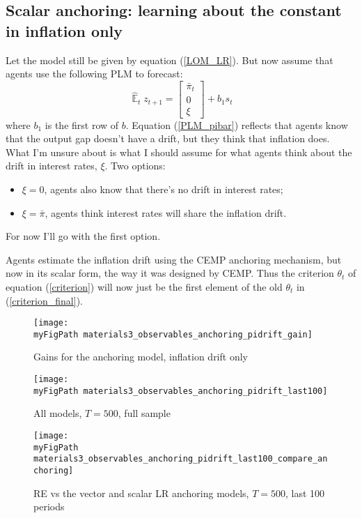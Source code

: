 \documentclass[11pt]{article}
\def \myFigPath {../figures/}
\renewcommand{\[}{\begin{equation}}
\renewcommand{\]}{\end{equation}}
\DeclareMathOperator{\E}{\mathbb{E}}
\def\myBiggerFigScale{0.4}
\def\myFigScale{0.3}
\begin{document}
\newpage
\subsection{Scalar anchoring: learning about the constant in inflation only}
 Let the model still be given by equation (\ref{LOM_LR}). But now assume that agents use the following PLM to forecast:
 \begin{equation}
 \hat{\E}_{t}z_{t+1} =  \begin{bmatrix} \bar{\pi}_{t} \\ 0 \\ \xi \label{PLM_pibar}
 \end{bmatrix} + b_1 s_t 
 \end{equation}
where $b_1$ is the first row of $b$. Equation (\ref{PLM_pibar}) reflects that agents know that the output gap doesn't have a drift, but they think that inflation does. What I'm unsure about is what I should assume for what agents think about the drift in interest rates, $\xi$. Two options:
\begin{itemize}
\item $\xi = 0$, agents also know that there's no drift in interest rates;
\item $\xi = \bar{\pi}$, agents think interest rates will share the inflation drift.  %
\end{itemize}
For now I'll go with the first option. 

Agents estimate the inflation drift using the CEMP anchoring mechanism, but now in its scalar form, the way it was designed by CEMP. Thus the criterion $\theta_t$ of equation (\ref{criterion}) will now just be the first element of the old $\theta_t$ in (\ref{criterion_final}). 

\begin{figure}[h!]
\texttt{[image: \\myFigPath materials3\_observables\_anchoring\_pidrift\_gain]} 
\caption{Gains for the anchoring model, inflation drift only}
\end{figure}
\newpage
\begin{figure}[h!]
\texttt{[image: \\myFigPath materials3\_observables\_anchoring\_pidrift\_last100]} 
\caption{All models, $T = 500$, full sample}
\end{figure}

\begin{figure}[h!]
\texttt{[image: \\myFigPath materials3\_observables\_anchoring\_pidrift\_last100\_compare\_anchoring]} 
\caption{RE vs the vector and scalar LR anchoring models, $T = 500$, last 100 periods}
\end{figure}
\newpage
\end{document}
